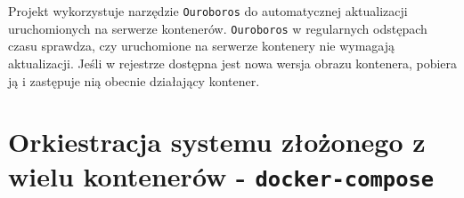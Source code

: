 Projekt wykorzystuje narzędzie \texttt{Ouroboros} do automatycznej aktualizacji
uruchomionych na serwerze kontenerów. \texttt{Ouroboros} w regularnych odstępach
czasu sprawdza, czy uruchomione na serwerze kontenery nie wymagają aktualizacji.
Jeśli w rejestrze dostępna jest nowa wersja obrazu kontenera, pobiera ją i zastępuje
nią obecnie działający kontener.

\section{Orkiestracja systemu złożonego z wielu kontenerów - \texttt{docker-compose}}